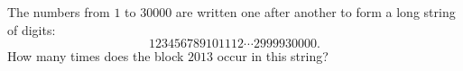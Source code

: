 The numbers from $1$ to $30000$ are written one after another to form a long string of digits:
\[
123456789101112\cdots2999930000 .
\]
How many times does the block $2013$ occur in this string?
